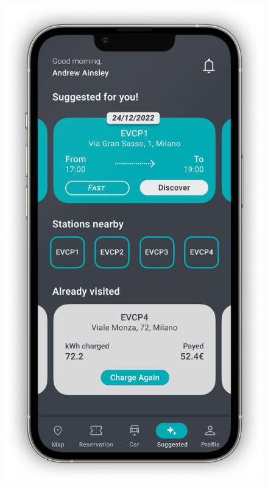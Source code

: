 \begin{figure}[H]
{        \includegraphics[scale=0.32]{src/mockups/suggested.png}
    }
    \newline
    \subfloat[Profile]{
}
\end{figure}
